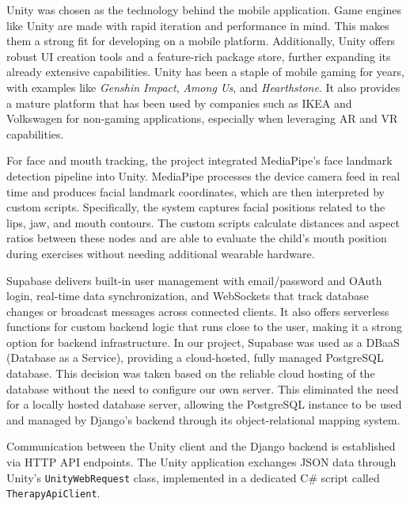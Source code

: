 Unity was chosen as the technology behind the mobile application. Game engines like Unity are made with rapid iteration and performance in mind. This makes them a strong fit for developing on a mobile platform. Additionally, Unity offers robust UI creation tools and a feature-rich package store, further expanding its already extensive capabilities. Unity has been a staple of mobile gaming for years, with examples like \textit{Genshin Impact}, \textit{Among Us}, and \textit{Hearthstone}. It also provides a mature platform that has been used by companies such as IKEA and Volkswagen for non-gaming applications, especially when leveraging AR and VR capabilities.

For face and mouth tracking, the project integrated MediaPipe's face landmark detection pipeline into Unity. MediaPipe processes the device camera feed in real time and produces facial landmark coordinates, which are then interpreted by custom scripts. Specifically, the system captures facial positions related to the lips, jaw, and mouth contours. The custom scripts calculate distances and aspect ratios between these nodes and are able to evaluate the child's mouth position during exercises without needing additional wearable hardware.

Supabase delivers built-in user management with email/password and OAuth login, real-time data synchronization, and WebSockets that track database changes or broadcast messages across connected clients. It also offers serverless functions for custom backend logic that runs close to the user, making it a strong option for backend infrastructure. In our project, Supabase was used as a DBaaS (Database as a Service), providing a cloud-hosted, fully managed PostgreSQL database. This decision was taken based on the reliable cloud hosting of the database without the need to configure our own server. This eliminated the need for a locally hosted database server, allowing the PostgreSQL instance to be used and managed by Django's backend through its object-relational mapping system.

Communication between the Unity client and the Django backend is established via HTTP API endpoints. The Unity application exchanges JSON data through Unity's \texttt{UnityWebRequest} class, implemented in a dedicated C\# script called \texttt{TherapyApiClient}.

